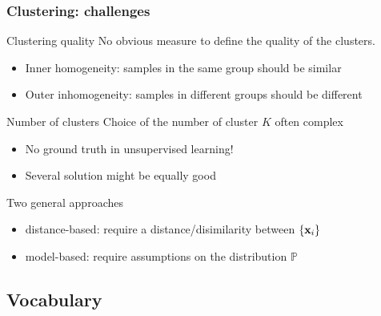 \documentclass{beamer}\usepackage[]{graphicx}\usepackage[]{color}
\begin{document}
\begin{frame}[label=Clustering2]

  \frametitle{Clustering: challenges}

    \begin{block}{Clustering quality}
      No obvious measure to define the \alert{quality} of the clusters.
      \begin{itemize}
        \item \alert{Inner} homogeneity: samples in the same group should be similar
        \item \alert{Outer} inhomogeneity: samples in different groups should be different
      \end{itemize}
    \end{block}

    \vspace{-.25cm}

    \begin{block}{Number of clusters}
      Choice of the number of cluster $K$ often complex
      \begin{itemize}
        \item No ground truth in unsupervised learning!
        \item Several solution might be equally good
      \end{itemize}
    \end{block}

    \vspace{-.25cm}

    \begin{block}{Two general approaches}
      \vspace{-.25cm}
      \begin{itemize}
        \item \alert{distance-based}: require a distance/disimilarity between $\{\mathbf{x}_i\}$
        \item \alert{model-based}: require assumptions on the distribution $\mathbb{P}$
      \end{itemize}
    \end{block}
    
\end{frame}

\subsection{Vocabulary}
\end{document}
